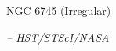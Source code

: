 \documentclass[letterpaper,landscape]{slides}
\begin{document}
\begin{slide}
\begin{center}
{\large \color{red} 
                  NGC 6745 (Irregular)  }
\end{center}

\begin{center}
\vskip -0.0in
\end{center}

\begin{flushright}
{ \tiny \em -- HST/STScI/NASA }
\end{flushright}

\vfill
\end{slide}
\end{document}
